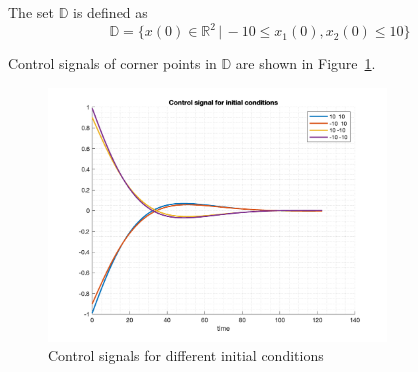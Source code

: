The set $\mathbb{D}$ is defined as 
\begin{equation}
    \mathbb{D}=\{x(0)\in\mathbb{R}^2\,|\,-10\leq x_1(0),x_2(0)\leq 10\}
\end{equation}

Control signals of corner points in $\mathbb{D}$ are shown in Figure~\ref{fig:plot1}.
\begin{figure}[!htb]
    \centering
    \includegraphics[width=0.8\textwidth]{plot1}
    \caption{Control signals for different initial conditions}
    \label{fig:plot1}
\end{figure}
